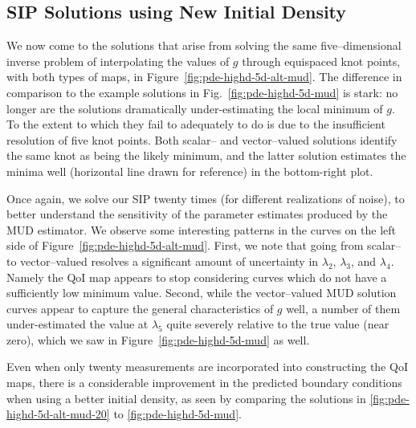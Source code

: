 

\subsection{SIP Solutions using New Initial Density}
We now come to the solutions that arise from solving the same five--dimensional inverse problem of interpolating the values of $g$ through equispaced knot points, with both types of maps, in Figure~\ref{fig:pde-highd-5d-alt-mud}.
The difference in comparison to the example solutions in Fig.~\ref{fig:pde-highd-5d-mud} is stark: no longer are the solutions dramatically under-estimating the local minimum of $g$.
To the extent to which they fail to adequately to do is due to the insufficient resolution of five knot points.
Both scalar-- and vector--valued solutions identify the same knot as being the likely minimum, and the latter solution estimates the minima well (horizontal line drawn for reference) in the bottom-right plot.

Once again, we solve our SIP twenty times (for different realizations of noise), to better understand the sensitivity of the parameter estimates produced by the MUD estimator.
We observe some interesting patterns in the curves on the left side of Figure~\ref{fig:pde-highd-5d-alt-mud}.
First, we note that going from scalar-- to vector--valued resolves a significant amount of uncertainty in $\lambda_2$, $\lambda_3$, and $\lambda_4$.
Namely the QoI map appears to stop considering curves which do not have a sufficiently low minimum value.
Second, while the vector--valued MUD solution curves appear to capture the general characteristics of $g$ well, a number of them under-estimated the value at $\lambda_5$ quite severely relative to the true value (near zero), which we saw in Figure~\ref{fig:pde-highd-5d-mud} as well.

Even when only twenty measurements are incorporated into constructing the QoI maps, there is a considerable improvement in the predicted boundary conditions when using a better initial density, as seen by comparing the solutions in \ref{fig:pde-highd-5d-alt-mud-20} to \ref{fig:pde-highd-5d-mud}.

